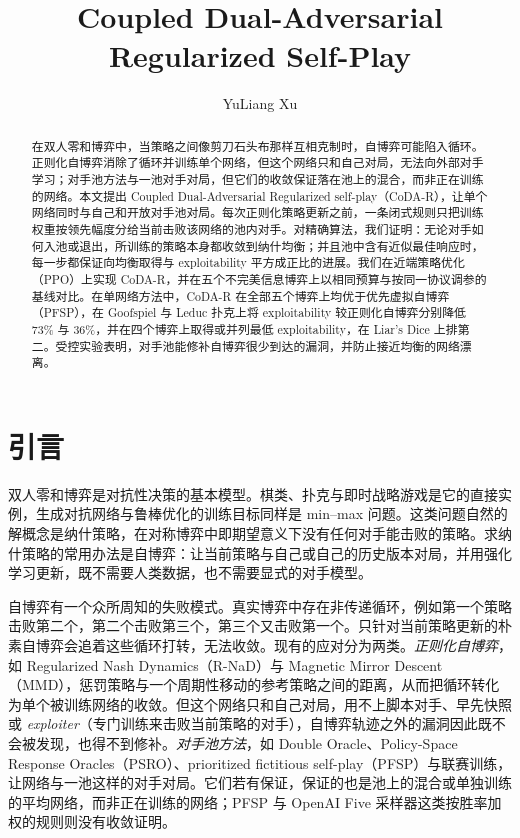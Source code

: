 \documentclass{article}
\title{Coupled Dual-Adversarial Regularized Self-Play}
\author{YuLiang Xu}
\affiliation{Beijing No.~8 High School}
\theoremstyle{plain}
\theoremstyle{remark}
\begin{document}
\maketitle

\begin{abstract}
在双人零和博弈中，当策略之间像剪刀石头布那样互相克制时，自博弈可能陷入循环。正则化自博弈消除了循环并训练单个网络，但这个网络只和自己对局，无法向外部对手学习；对手池方法与一池对手对局，但它们的收敛保证落在池上的混合，而非正在训练的网络。本文提出 Coupled Dual-Adversarial Regularized self-play（CoDA-R），让单个网络同时与自己和开放对手池对局。每次正则化策略更新之前，一条闭式规则只把训练权重按领先幅度分给当前击败该网络的池内对手。对精确算法，我们证明：无论对手如何入池或退出，所训练的策略本身都收敛到纳什均衡；并且池中含有近似最佳响应时，每一步都保证向均衡取得与 exploitability 平方成正比的进展。我们在近端策略优化（PPO）上实现 CoDA-R，并在五个不完美信息博弈上以相同预算与按同一协议调参的基线对比。在单网络方法中，CoDA-R 在全部五个博弈上均优于优先虚拟自博弈（PFSP），在 Goofspiel 与 Leduc 扑克上将 exploitability 较正则化自博弈分别降低 73\% 与 36\%，并在四个博弈上取得或并列最低 exploitability，在 Liar's Dice 上排第二。受控实验表明，对手池能修补自博弈很少到达的漏洞，并防止接近均衡的网络漂离。
\end{abstract}

\section{引言}

双人零和博弈是对抗性决策的基本模型。棋类、扑克与即时战略游戏是它的直接实例\citep{silver2018alphazero,brown2018libratus,vinyals2019alphastar,perolat2022stratego}，生成对抗网络与鲁棒优化的训练目标同样是 min--max 问题\citep{goodfellow2014gan,daskalakis2018optimism}。这类问题自然的解概念是纳什策略，在对称博弈中即期望意义下没有任何对手能击败的策略。求纳什策略的常用办法是自博弈：让当前策略与自己或自己的历史版本对局，并用强化学习更新，既不需要人类数据，也不需要显式的对手模型。

自博弈有一个众所周知的失败模式。真实博弈中存在非传递循环\citep{czarnecki2020spinning}，例如第一个策略击败第二个，第二个击败第三个，第三个又击败第一个。只针对当前策略更新的朴素自博弈会追着这些循环打转，无法收敛\citep{balduzzi2018mechanics,balduzzi2019openended}。现有的应对分为两类。\emph{正则化自博弈}，如 Regularized Nash Dynamics（R-NaD）与 Magnetic Mirror Descent（MMD），惩罚策略与一个周期性移动的参考策略之间的距离，从而把循环转化为单个被训练网络的收敛\citep{perolat2021rnad,perolat2022stratego,sokota2023mmd}。但这个网络只和自己对局，用不上脚本对手、早先快照或 \emph{exploiter}（专门训练来击败当前策略的对手），自博弈轨迹之外的漏洞因此既不会被发现，也得不到修补\citep{openai2019dota,bansal2018emergent}。\emph{对手池方法}，如 Double Oracle、Policy-Space Response Oracles（PSRO）、prioritized fictitious self-play（PFSP）与联赛训练，让网络与一池这样的对手对局\citep{mcmahan2003doubleoracle,lanctot2017psro,vinyals2019alphastar}。它们若有保证，保证的也是池上的混合或单独训练的平均网络，而非正在训练的网络；PFSP 与 OpenAI Five 采样器这类按胜率加权的规则则没有收敛证明。
\end{document}
